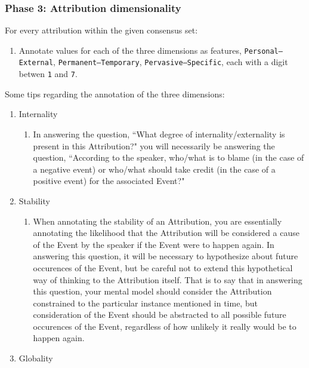 \documentclass[a4paper,12pt]{article}
\begin{document}
    \subsubsection{Phase 3: Attribution dimensionality}
    For every attribution within the given consensus set:
        \begin{enumerate}
            \item Annotate values for each of the three dimensions as features, \texttt{Personal--External}, \texttt{Permanent--Temporary}, \texttt{Pervasive--Specific}, each with a digit betwen \texttt{1} and \texttt{7}.
        \end{enumerate}
    \noindent Some tips regarding the annotation of the three dimensions:
        \begin{enumerate}
        \item Internality
            \begin{enumerate}
                \item In answering the question, ``What degree of internality/externality is present in this Attribution?" you will necessarily be answering the question, ``According to the speaker, who/what is to blame (in the case of a negative event) or who/what should take credit (in the case of a positive event) for the associated Event?"
            \end{enumerate}
        \item Stability
            \begin{enumerate}
                \item When annotating the stability of an Attribution, you are essentially annotating the likelihood that the Attribution will be considered a cause of the Event by the speaker if the Event were to happen again. In answering this question, it will be necessary to hypothesize about future occurences of the Event, but be careful not to extend this hypothetical way of thinking to the Attribution itself. That is to say that in answering this question, your mental model should consider the Attribution constrained to the particular instance mentioned in time, but consideration of the Event should be abstracted to all possible future occurences of the Event, regardless of how unlikely it really would be to happen again.
            \end{enumerate}
        \item Globality
            \begin{enumerate}

\end{enumerate}
\end{enumerate}
\end{document}
